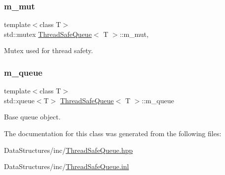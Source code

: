 \subsubsection{\texorpdfstring{m\+\_\+mut}{m\_mut}}
{\footnotesize\ttfamily template$<$class T$>$ \\
std\+::mutex \hyperlink{class_thread_safe_queue}{Thread\+Safe\+Queue}$<$ T $>$\+::m\+\_\+mut\hspace{0.3cm}{\ttfamily [mutable]}, {\ttfamily [private]}}



Mutex used for thread safety. 

\mbox{\label{class_thread_safe_queue_a3b84a16818557f4aee11c1b810e3f953}} 
\subsubsection{\texorpdfstring{m\+\_\+queue}{m\_queue}}
{\footnotesize\ttfamily template$<$class T$>$ \\
std\+::queue$<$T$>$ \hyperlink{class_thread_safe_queue}{Thread\+Safe\+Queue}$<$ T $>$\+::m\+\_\+queue\hspace{0.3cm}{\ttfamily [private]}}



Base queue object. 



The documentation for this class was generated from the following files\+:\begin{DoxyCompactItemize}
\item 
Data\+Structures/inc/\hyperlink{_thread_safe_queue_8hpp}{Thread\+Safe\+Queue.\+hpp}\item 
Data\+Structures/inc/\hyperlink{_thread_safe_queue_8inl}{Thread\+Safe\+Queue.\+inl}\end{DoxyCompactItemize}
